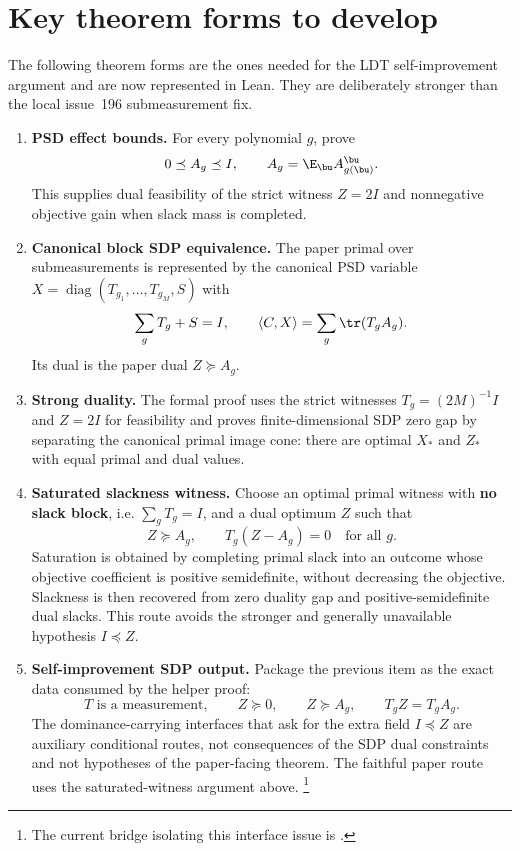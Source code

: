\documentclass[11pt]{article}
\begin{document}
\section{Key theorem forms to develop}

The following theorem forms are the ones needed for the LDT self-improvement
argument and are now represented in Lean.  They are deliberately stronger than
the local issue~196 submeasurement fix.

\begin{enumerate}
  \item \textbf{PSD effect bounds.}  For every polynomial $g$, prove
  \[
    0\preceq A_g\preceq I,
    \qquad
    A_g=\E_{\bu} A^{\bu}_{g(\bu)}.
  \]
  This supplies dual feasibility of the strict witness $Z=2I$ and nonnegative
  objective gain when slack mass is completed.

  \item \textbf{Canonical block SDP equivalence.}  The paper primal over
  submeasurements is represented by the canonical PSD variable
  $X=\operatorname{diag}(T_{g_1},\ldots,T_{g_M},S)$ with
  \[
    \sum_gT_g+S=I,
    \qquad
    \langle C,X\rangle=\sum_g\tr(T_gA_g).
  \]
  Its dual is the paper dual $Z\succeq A_g$.

  \item \textbf{Strong duality.}  The formal proof uses the strict witnesses
  $T_g=(2M)^{-1}I$ and $Z=2I$ for feasibility and proves finite-dimensional SDP
  zero gap by separating the canonical primal image cone: there are optimal
  $X_*$ and $Z_*$ with equal primal and dual values.

  \item \textbf{Saturated slackness witness.}  Choose an optimal primal witness
  with \textbf{no slack block}, i.e. $\sum_gT_g=I$, and a dual optimum $Z$ such
  that
  \[
    Z\succeq A_g,
    \qquad
    T_g(Z-A_g)=0
    \quad\text{for all }g.
  \]
  Saturation is obtained by completing primal slack into an outcome whose
  objective coefficient is positive semidefinite, without decreasing the
  objective.  Slackness is then recovered from zero duality gap and
  positive-semidefinite dual slacks.  This route avoids the stronger and
  generally unavailable hypothesis $I\preceq Z$.

  \item \textbf{Self-improvement SDP output.}  Package the previous item as the
  exact data consumed by the helper proof:
  \[
    T\text{ is a measurement},
    \qquad
    Z\succeq0,
    \qquad
    Z\succeq A_g,
    \qquad
    T_gZ=T_gA_g.
  \]
  The dominance-carrying interfaces that ask for the extra field $I\preceq Z$
  are auxiliary conditional routes, not consequences of the SDP dual constraints
  and not hypotheses of the paper-facing theorem.  The faithful paper route uses
  the saturated-witness argument above.%
  \footnote{The current bridge isolating this interface issue is
  .}
\end{enumerate}
\end{document}
